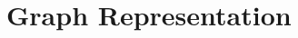 \documentclass[aspectratio=169,10pt]{beamer}
\begin{document}
  

\section{Graph Representation}
\end{document}
